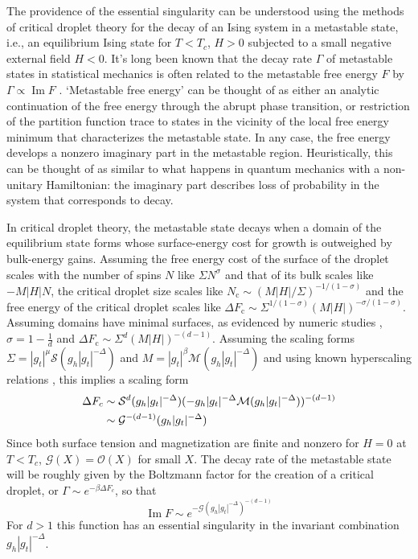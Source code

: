 \documentclass[aps,prl,reprint,fleqn]{revtex4-1}
\def\[{\begin{equation}}
\def\]{\end{equation}}
\def\im{\mathop{\mathrm{Im}}\nolimits}
\def\O{\mathcal O}
\def\c{\mathrm c}
\begin{document}
The providence of the essential singularity can be understood using the
methods of critical droplet theory for the decay of an Ising system in a
metastable state, i.e., an equilibrium Ising state for $T<T_c$, $H>0$
subjected to a small negative external field $H<0$.
It's long been known that the decay rate $\Gamma$ of metastable states in
statistical mechanics is often related to the metastable free energy $F$ by
$\Gamma\propto\im F$
\cite{langer.1967.condensation,langer.1969.metastable,gaveau.1989.analytic,privman.1982.analytic}.
`Metastable free energy' can be thought of as either an analytic continuation of the free energy
through the abrupt phase transition, or restriction of the partition function
trace to states in the vicinity of the local free energy minimum that
characterizes the metastable state. In any case, the free energy develops a
nonzero imaginary part in the metastable region. Heuristically, this can be
thought of as similar to what happens in quantum mechanics with a non-unitary
Hamiltonian: the imaginary part describes loss of probability in the system
that corresponds to decay. 

In critical droplet theory, the metastable state decays when a domain of the
equilibrium state forms whose surface-energy cost for growth is outweighed by
bulk-energy gains. Assuming the free energy cost of the surface of the droplet
scales with the number of spins $N$ like $\Sigma N^\sigma$ and that of its
bulk scales like $-M|H|N$, the critical droplet size scales like
$N_\c\sim(M|H|/\Sigma)^{-1/(1-\sigma)}$ and the free energy of the critical
droplet scales like $\Delta F_\c\sim\Sigma^{1/(1-\sigma)}(M|H|)^{-\sigma/(1-\sigma)}$.
Assuming domains have minimal surfaces, as evidenced by numeric studies
\cite{gunther.1993.transfer-matrix}, $\sigma=1-\frac1d$ and
$\Delta F_\c\sim\Sigma^d(M|H|)^{-(d-1)}$. Assuming the scaling forms
$\Sigma=|g_t|^\mu\mathcal S(g_h|g_t|^{-\Delta})$ and $M=|g_t|^\beta\mathcal
M(g_h|g_t|^{-\Delta})$ and using known hyperscaling relations
\cite{widom.1981.interface}, this implies a scaling form
\begin{align}
  \Delta F_c&
  \sim\mathcal S^d(g_h|g_t|^{-\Delta})(-g_h|g_t|^{-\Delta}\mathcal
    M(g_h|g_t|^{-\Delta}))^{-(d-1)}\notag\\
  &\sim\mathcal G^{-(d-1)}(g_h|g_t|^{-\Delta})
\end{align}
Since both surface tension and magnetization are finite and nonzero for $H=0$
at $T<T_c$, $\mathcal G(X)=\O(X)$ for small $X$.
The decay rate of the metastable state will be roughly given by the Boltzmann
factor for the creation of a critical droplet, or $\Gamma\sim e^{-\beta\Delta
F_c}$, so that
\[
  \im F\sim e^{-\mathcal G(g_h|g_t|^{-\Delta})^{-(d-1)}}
\]
For $d>1$ this function has an essential singularity in the invariant
combination $g_h|g_t|^{-\Delta}$.
\end{document}

